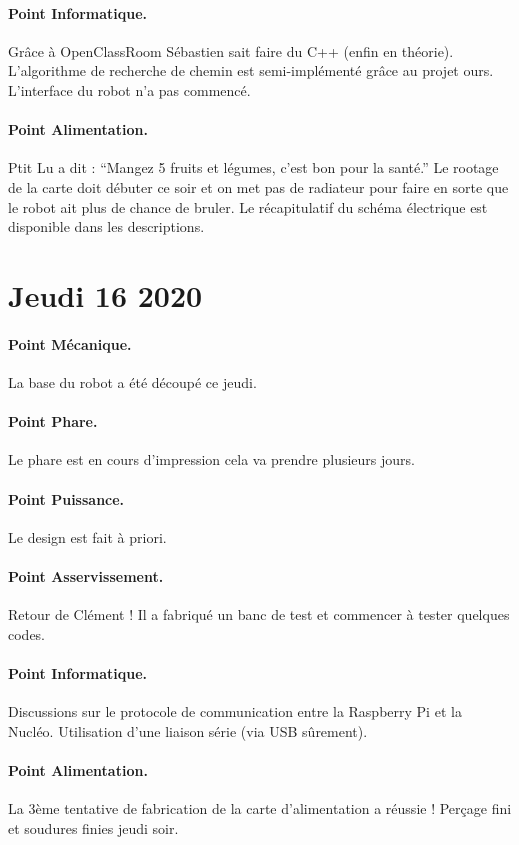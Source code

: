 \documentclass[a4paper,10pt]{report}
\theoremstyle{definition}
\begin{document}
\begin{spacing}{1.5}
\paragraph{Point Informatique.}
Grâce à OpenClassRoom Sébastien sait faire du C++ (enfin en théorie).
L'algorithme de recherche de chemin est semi-implémenté grâce au projet ours.
L'interface du robot n'a pas commencé.
\paragraph{Point Alimentation.}
Ptit Lu a dit : ``Mangez 5 fruits et légumes, c'est bon pour la santé.''
Le rootage de la carte doit débuter ce soir et on met pas de radiateur pour
faire en sorte que le robot ait plus de chance de bruler. Le récapitulatif du
schéma électrique est disponible dans les descriptions.


\newpage
\section*{Jeudi 16 2020}
\paragraph{Point Mécanique.}
La base du robot a été découpé ce jeudi.
\paragraph{Point Phare.}
Le phare est en cours d'impression cela va prendre plusieurs jours.
\paragraph{Point Puissance.}
Le design est fait à priori.
\paragraph{Point Asservissement.}
Retour de Clément ! Il a fabriqué un banc de test et commencer à tester quelques codes.
\paragraph{Point Informatique.}
Discussions sur le protocole de communication entre la Raspberry Pi et la
Nucléo. Utilisation d'une liaison série (via USB sûrement).
\paragraph{Point Alimentation.}
La 3ème tentative de fabrication de la carte d'alimentation a réussie ! Perçage
fini et soudures finies jeudi soir.

\newpage
\end{spacing}
\end{document}
